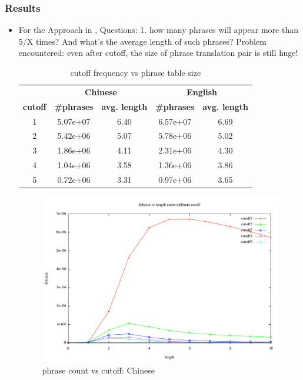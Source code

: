 \documentclass[11pt, letterpaper]{article}   	%
\begin{document}
\subsubsection{Results}
\begin{itemize}
\item For the Approach in \cite{marcu-wong-02},
Questions: 1. how many phrases will appear more than 5/X times? And what's the average length of such phrases? Problem encountered: even after cutoff, the size of phrase translation pair is still huge! 

\begin{table}
\centering
\begin{tabular}{ c | c | c | c | c }
 & \multicolumn{2}{c}{\bf{Chinese}} & \multicolumn{2}{|c}{\bf{English}}  \\
  \cline{2-5} 
  \bf{cutoff} & \bf{\#phrases} & \bf{avg. length} & \bf{\#phrases} & \bf{avg. length} \\
  \hline
  1 & 5.07e+07  & 6.40 & 6.57e+07 & 6.69  \\
  \hline
  2 & 5.42e+06 & 5.07 &5.78e+06 & 5.02\\
  \hline
  3 & 1.86e+06  & 4.11 & 2.31e+06& 4.30\\
  \hline
  4 & 1.04e+06 & 3.58 &1.36e+06 &3.86\\
 \hline
  5 & 0.72e+06 & 3.31 & 0.97e+06&3.65\\
 \end{tabular}
 \caption{cutoff frequency vs phrase table size}
  \label{tab:phrase-cutoff}
\end{table}

\begin{figure}[p]
\centering
\includegraphics[width=1.0\textwidth]{phrase-count-chinese.pdf}
\caption{phrase count vs cutoff: Chinese}
\label{fig:phrase-count-chinese}
\end{figure}


\end{itemize}
\end{document}
